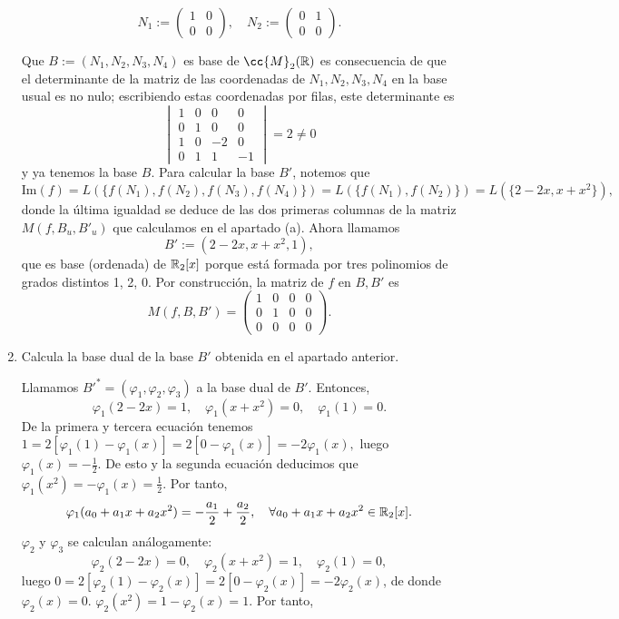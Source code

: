 \documentclass[12pt]{article}
\begin{document}
\begin{ejercicio}[2.5 puntos]
\begin{enumerate}
			$$ N_1 := \begin{pmatrix}
				1 & 0 \\
				0 & 0
			\end{pmatrix}, \quad
			N_2 := \begin{pmatrix}
				0 & 1 \\
				0 & 0
			\end{pmatrix}. $$
			
			Que $B := (N_1, N_2, N_3, N_4)$ es base de $\cc{M}_2(\R)$ es consecuencia de que el determinante de la matriz de las coordenadas de $N_1, N_2, N_3, N_4$ en la base usual es no nulo; escribiendo estas coordenadas por filas, este determinante es
			$$\begin{vmatrix}
				1 & 0 & 0 & 0 \\
				0 & 1 & 0 & 0 \\
				1 & 0 & -2 & 0 \\
				0 & 1 & 1 & -1
			\end{vmatrix} = 2 \ne 0 $$
			y ya tenemos la base $B$. Para calcular la base $B'$, notemos que 
			$$\text{Im}(f) = L(\{f(N_1), f(N_2), f(N_3), f(N_4)\}) = L(\{f(N_1), f(N_2)\}) = L(\{2 - 2x, x + x^2\}),$$ 
			donde la última igualdad se deduce de las dos primeras columnas de la matriz $M(f, B_u, B'_u)$ que calculamos en el apartado (a). Ahora llamamos $$B' := (2 - 2x, x + x^2, 1),$$ 
			que es base (ordenada) de ${\mathbb{R}}_2[x]$ porque está formada por tres polinomios de grados distintos 1, 2, 0. Por construcción, la matriz de $f$ en $B, B'$ es
			$$
			M(f, B, B') = \begin{pmatrix}
				1 & 0 & 0 & 0 \\
				0 & 1 & 0 & 0 \\
				0 & 0 & 0 & 0
			\end{pmatrix}. $$
			
			
			\item Calcula la base dual de la base $B'$ obtenida en el apartado anterior.
			
			Llamamos $B'^\ast = (\varphi_1, \varphi_2, \varphi_3)$ a la base dual de $B'$. Entonces, 
			$$
			\varphi_1(2 - 2x) = 1, \quad \varphi_1(x + x^2) = 0, \quad \varphi_1(1) = 0.
			$$
			De la primera y tercera ecuación tenemos
			$ 1 = 2[\varphi_1(1) - \varphi_1(x)] = 2[0 - \varphi_1(x)] = -2\varphi_1(x),$ luego $ \displaystyle \varphi_1(x) = -\frac{1}{2}$. De esto y la segunda ecuación deducimos que $\displaystyle \varphi_1(x^2) = -\varphi_1(x) = \frac{1}{2}.$
			Por tanto,
			$$
			\varphi_1(a_0 + a_1 x + a_2 x^2) = -\frac{a_1}{2} + \frac{a_2}{2}, \quad \forall a_0 + a_1 x + a_2 x^2 \in {\mathbb{R}}_2[x].
			$$
			$\varphi_2$ y $\varphi_3$ se calculan análogamente:
			$$\varphi_2(2 - 2x) = 0, \quad \varphi_2(x + x^2) = 1, \quad \varphi_2(1) = 0,$$
			luego $ 0 = 2[\varphi_2(1) - \varphi_2(x)] = 2[0 - \varphi_2(x)] = -2\varphi_2(x)$, de donde $\varphi_2(x) = 0$. $\varphi_2(x^2) = 1 - \varphi_2(x) = 1.$ Por tanto,
		

\end{enumerate}
\end{ejercicio}
\end{document}
